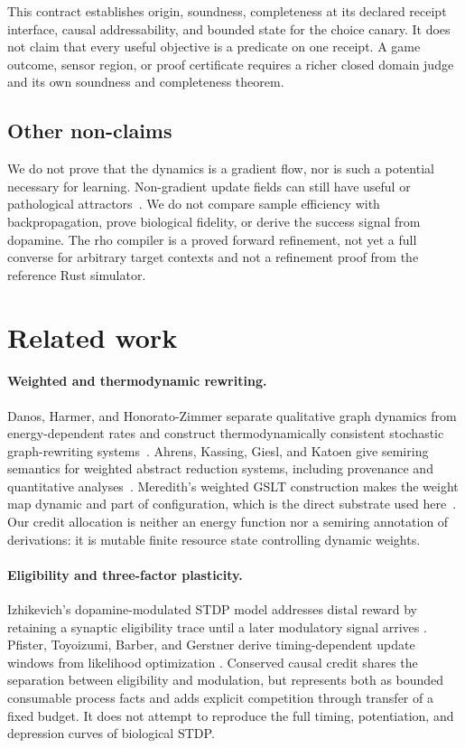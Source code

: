 \documentclass[11pt]{article}
\newcommand{\GSLT}{\textup{GSLT}}
\begin{document}
This contract establishes origin, soundness, completeness at its declared
receipt interface, causal addressability, and bounded state for the choice
canary.  It does not claim that every useful objective is a predicate on one
receipt.  A game outcome, sensor region, or proof certificate requires a
richer closed domain judge and its own soundness and completeness theorem.

\subsection{Other non-claims}

We do not prove that the dynamics is a gradient flow, nor is such a potential
necessary for learning.  Non-gradient update fields can still have useful or
pathological attractors~\cite{notaThomas2020,balduzzi2018}.  We do not compare
sample efficiency with backpropagation, prove biological fidelity, or derive
the success signal from dopamine.  The rho compiler is a proved forward
refinement, not yet a full converse for arbitrary target contexts and not a
refinement proof from the reference Rust simulator.

\section{Related work}
\label{sec:related}

\paragraph{Weighted and thermodynamic rewriting.}
Danos, Harmer, and Honorato-Zimmer separate qualitative graph dynamics from
energy-dependent rates and construct thermodynamically consistent stochastic
graph-rewriting systems~\cite{danos2015}.  Ahrens, Kassing, Giesl, and Katoen
give semiring semantics for weighted abstract reduction systems, including
provenance and quantitative analyses~\cite{ahrens2025}.  Meredith's weighted
\GSLT{} construction makes the weight map dynamic and part of configuration,
which is the direct substrate used here~\cite{meredith2026weighted}.  Our
credit allocation is neither an energy function nor a semiring annotation of
derivations: it is mutable finite resource state controlling dynamic weights.

\paragraph{Eligibility and three-factor plasticity.}
Izhikevich's dopamine-modulated STDP model addresses distal reward by retaining
a synaptic eligibility trace until a later modulatory signal arrives
\cite{izhikevich2007}.  Pfister, Toyoizumi, Barber, and Gerstner derive
timing-dependent update windows from likelihood optimization
\cite{pfister2006}.  Conserved causal credit shares the separation between
eligibility and modulation, but represents both as bounded consumable process
facts and adds explicit competition through transfer of a fixed budget.  It
does not attempt to reproduce the full timing, potentiation, and depression
curves of biological STDP.
\end{document}
